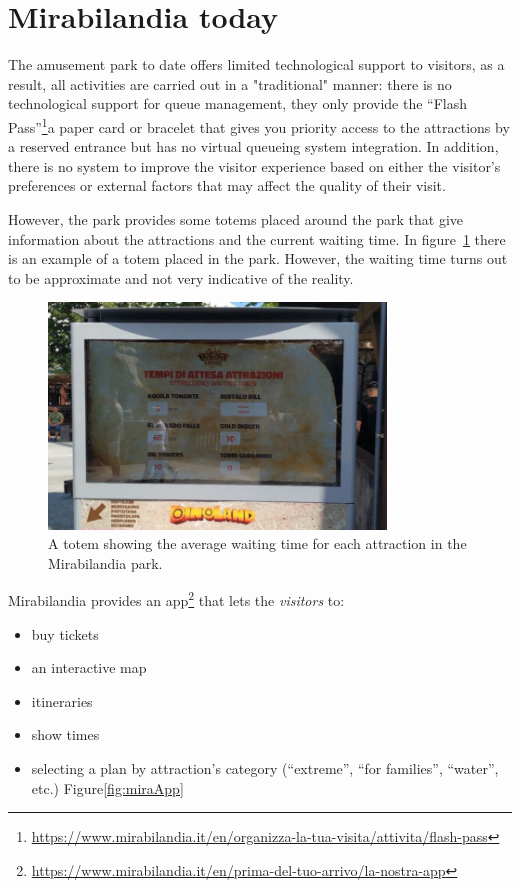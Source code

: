 \section{Mirabilandia today}\label{sec:mirabilandia-today}
The amusement park to date offers limited technological support to visitors, as a result, all activities are carried out in a "traditional" manner:
there is no technological support for queue management, they only provide the
``Flash Pass''\footnote{\url{https://www.mirabilandia.it/en/organizza-la-tua-visita/attivita/flash-pass}}a paper card or bracelet that gives you
priority access to the attractions by a reserved entrance but has no virtual queueing system integration.
In addition, there is no system to improve the visitor experience based on either the visitor's preferences or external factors that may affect the
quality of their visit.

However, the park provides some totems placed around the park that give information about the attractions and the current waiting time.
In figure~\ref{fig:mira-totem} there is an example of a totem placed in the park. However, the waiting time turns out to be approximate and
not very indicative of the reality.

\begin{figure}[H]
	\centering
	\includegraphics[width=0.8\textwidth]{img/mira-totem.jpg}
	\caption{A totem showing the average waiting time for each attraction in the Mirabilandia park.}
	\label{fig:mira-totem}
\end{figure}

Mirabilandia provides an app\footnote{\url{https://www.mirabilandia.it/en/prima-del-tuo-arrivo/la-nostra-app}} that lets the \textit{visitors} to:
\begin{itemize}
	\item buy tickets
	\item an interactive map
	\item itineraries
	\item show times
	\item selecting a plan by attraction's category (``extreme'', ``for families'', ``water'', etc.) Figure\ref{fig:miraApp}
\end{itemize}

